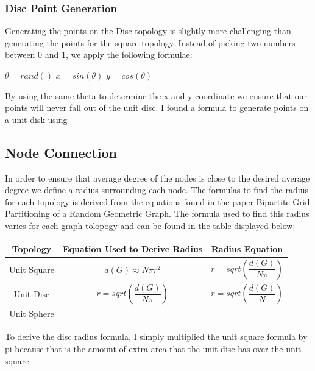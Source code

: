 \documentclass{article}
\begin{document}
  \subsubsection{Disc Point Generation}
  Generating the points on the Disc topology is slightly more challenging than generating the points for the square topology.
  Instead of picking two numbers between 0 and 1, we apply the following formulae:
  	\begin{center}
    $\theta=rand()$ \newline
    $x=sin(\theta)$ \newline
    $y=cos(\theta)$ \newline
  	\end{center}
  By using the same theta to determine the x and y coordinate we ensure that our points will never fall out of the unit disc.
  I found a formula to generate points on a unit disk using \cite{40023}


  \subsection{Node Connection}
  In order to ensure that average degree of the nodes is close to the desired average degree we define a radius surrounding each node.
  The formulas to find the radius for each topology is derived from the equations found in the paper Bipartite Grid Partitioning of a Random Geometric Graph\cite{chen2017bipartite}.
  The formula used to find this radius varies for each graph tolopogy and can be found in the table displayed below:

  \begin{tabular}{ |c|c|c| }
  	  \hline
  	  Topology & Equation Used to Derive Radius & Radius Equation \\
  	  \hline
  	  Unit Square & $d(G) \approx N\pi r^2 $ & $r = sqrt(\dfrac{d(G)}{N\pi})$ \\
  	  \hline
  	  Unit Disc & $r = sqrt(\dfrac{d(G)}{N\pi})$ & $r = sqrt(\dfrac{d(G)}{N})$ \\
  	  \hline
  	  Unit Sphere & & \\
  	  \hline
  \end{tabular}

		To derive the disc radius formula, I simply multiplied the unit square formula by pi because that is the amount of extra area that the unit disc has over the unit square
\end{document}
